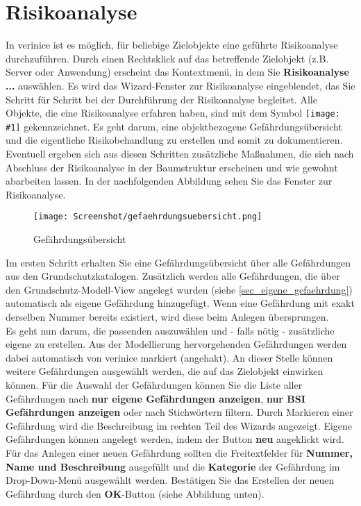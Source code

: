 \documentclass[a4paper,10pt]{book}
\newcommand{\icon}[1]{\texttt{[image: \#1]}}
\begin{document}
\section{Risikoanalyse} \label{Risikoanalyse}
In verinice ist es möglich, für beliebige Zielobjekte eine geführte Risikoanalyse durchzuführen. Durch einen Rechtsklick auf das betreffende Zielobjekt (z.B. Server oder Anwendung) erscheint das Kontextmenü, in dem Sie \textbf{Risikoanalyse ...} auswählen. Es wird das Wizard-Fenster zur Risikoanalyse eingeblendet, das Sie Schritt für Schritt bei der Durchführung der Risikoanalyse begleitet. Alle Objekte, die eine Risikoanalyse erfahren haben, sind mit dem Symbol \icon{Icon/Risikoanalyse.png} gekennzeichnet. Es geht darum, eine objektbezogene Gefährdungsübersicht und die eigentliche Risikobehandlung zu erstellen und somit zu dokumentieren. Eventuell ergeben sich aus diesen Schritten zusätzliche Maßnahmen, die sich nach Abschluss der Risikoanalyse in der Baumstruktur erscheinen und wie gewohnt abarbeiten lassen. In der nachfolgenden Abbildung sehen Sie das Fenster zur Risikoanalyse.
\newline
\begin{figure}[H]
  \centering
  \texttt{[image: Screenshot/gefaehrdungsuebersicht.png]}
  \caption{\label{Gefaehrdungsuebersicht} Gefährdungsübersicht}
\end{figure}
Im ersten Schritt erhalten Sie eine Gefährdungsübersicht über alle Gefährdungen aus den Grundschutzkatalogen. Zusätzlich werden alle Gefährdungen, die über den Grundschutz-Modell-View angelegt wurden (siehe \ref{sec_eigene_gefaehrdung}) automatisch als eigene Gefährdung hinzugefügt. Wenn eine Gefährdung mit exakt derselben Nummer bereits existiert, wird diese beim Anlegen übersprungen.\\
Es geht nun darum, die passenden auszuwählen und - falls nötig - zusätzliche eigene zu erstellen. Aus der Modellierung hervorgehenden Gefährdungen werden dabei automatisch von verinice markiert (angehakt). An dieser Stelle können weitere Gefährdungen ausgewählt werden, die auf das Zielobjekt einwirken können. Für die Auswahl der Gefährdungen können Sie die Liste aller Gefährdungen nach \textbf{nur eigene Gefährdungen anzeigen}, \textbf{nur BSI Gefährdungen anzeigen} oder nach Stichwörtern filtern.
Durch Markieren einer Gefährdung wird die Beschreibung im rechten Teil des Wizards angezeigt.
Eigene Gefährdungen können angelegt werden, indem der Button \textbf{neu} angeklickt wird. Für das Anlegen einer neuen Gefährdung sollten die Freitextfelder für \textbf{Nummer, Name und Beschreibung} ausgefüllt und die \textbf{Kategorie} der Gefährdung im Drop-Down-Menü ausgewählt werden. Bestätigen Sie das Erstellen der neuen Gefährdung durch den \textbf{OK}-Button (siehe Abbildung unten).
\end{document}
